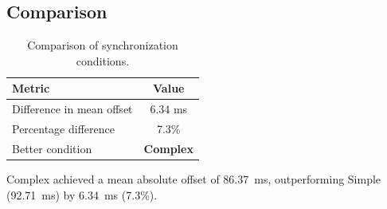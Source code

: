 \subsection*{Comparison}

\begin{table}[h!]
\centering
\begin{tabular}{|l|c|}
\hline
Metric & Value \\
\hline
Difference in mean offset & 6.34 ms \\
Percentage difference & 7.3\% \\
Better condition & \textbf{Complex} \\
\hline
\end{tabular}
\caption{Comparison of synchronization conditions.}
\label{tab:sync_comparison}
\end{table}

Complex achieved a mean absolute offset of 86.37~ms, outperforming Simple (92.71~ms) by 6.34~ms (7.3\%).
